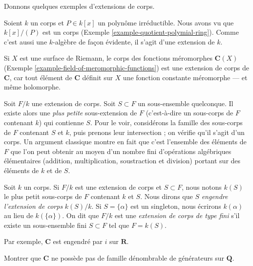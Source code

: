 \noindent
Donnons quelques exemples d'extensions de corps.

\begin{example}
\label{example-monogenic-extension}
Soient $k$ un corps et $P \in k[x]$ un polynôme irréductible. Nous avons
vu que $k[x]/(P)$ est un corps (Exemple \ref{example-quotient-polymial-ring}).
Comme c'est aussi une $k$-algèbre de façon évidente, il s'agit d'une extension de $k$.
\end{example}

\begin{example}
\label{example-field-of-meromorphic-functions-extension-C}
Si $X$ est une surface de Riemann, le corps des fonctions méromorphes
$\mathbf{C}(X)$ (Exemple \ref{example-field-of-meromorphic-functions})
est une extension de corps de $\mathbf{C}$, car tout élément de $\mathbf{C}$
définit sur $X$ une fonction constante méromorphe --- et même holomorphe.
\end{example}

\noindent
Soit $F/k$ une extension de corps. Soit $S \subset F$ un sous-ensemble quelconque.
Il existe alors une {\it plus petite} sous-extension de $F$ (c'est-à-dire un sous-corps de
$F$ contenant $k$) qui contienne $S$. Pour le voir, considérons la famille des
sous-corps de $F $ contenant $S$ et $k$, puis prenons leur intersection ; on
vérifie qu'il s'agit d'un corps. Un argument classique montre en fait que
c'est l'ensemble des éléments de $F$ que l'on peut obtenir au moyen d'un nombre fini
d'opérations algébriques élémentaires (addition, multiplication, soustraction
et division) portant sur des éléments de $k$ et de $S$.

\begin{definition}
\label{definition-generated-by}
Soit $k$ un corps. Si $F/k$ est une extension de corps et
$S \subset F$, nous notons $k(S)$ le plus petit sous-corps de $F$
contenant $k$ et $S$. Nous dirons que $S$ {\it engendre
l'extension de corps} $k(S)/k$. Si $S = \{\alpha\}$ est un singleton, nous
écrirons $k(\alpha)$ au lieu de $k(\{\alpha\})$. On dit que $F/k$ est une
{\it extension de corps de type fini} s'il existe un
sous-ensemble fini $S \subset F$ tel que $F = k(S)$.
\end{definition}

\noindent
Par exemple, $\mathbf{C}$ est engendré par $i$ sur $\mathbf{R}$.

\begin{exercise}
\label{exercise-C-not-countably-generated}
Montrer que $\mathbf{C}$ ne possède pas de famille dénombrable de générateurs sur
$\mathbf{Q}$.
\end{exercise}

